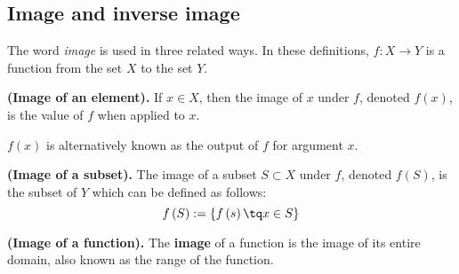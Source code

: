 \subsection{Image and inverse image}
The word \textit{image} is used in three related ways. In these definitions, $f:X\to Y$ is a function from the set $X$ to the set $Y$.
\begin{definition}
    \textbf{(Image of an element).} If $x\in X$, then the image of $x$ under $f$, denoted $f\left( x \right) $, is the value of $f$ when applied to $x$.
\end{definition}
\begin{note}
    $f\left( x \right) $ is alternatively known as the output of $f$ for argument $x$.
\end{note}
\begin{definition}
    \textbf{(Image of a subset).} The image of a subset $S\subset X$ under $f$, denoted $f\left( S \right) $, is the subset of $Y$ which can be defined as follows:
    \begin{equation}
        f\left( S \right) := \{f\left( s \right) \tq x\in S\} 
    \end{equation}
\end{definition}
\begin{definition}
    \textbf{(Image of a function).} The \textbf{image} of a function is the image of its entire domain, also known as the range of the function.
\end{definition}


